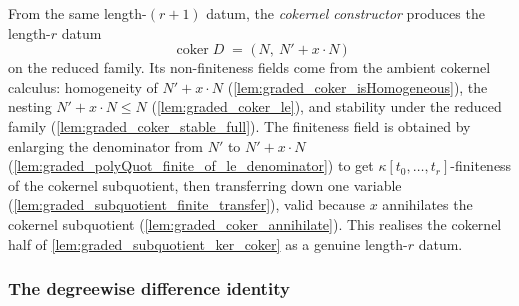 \begin{definition}\leanok
  \label{def:graded_subquotientDatum_coker}
  From the same length-\((r+1)\) datum, the \emph{cokernel constructor} produces the
  length-\(r\) datum
  \[
    \operatorname{coker} D \;=\; \bigl(\,N,\ N' + x \cdot N\,\bigr)
  \]
  on the reduced family. Its non-finiteness fields come from the ambient cokernel
  calculus: homogeneity of \(N' + x \cdot N\) (\cref{lem:graded_coker_isHomogeneous}),
  the nesting \(N' + x \cdot N \le N\) (\cref{lem:graded_coker_le}), and stability
  under the reduced family (\cref{lem:graded_coker_stable_full}). The finiteness field
  is obtained by enlarging the denominator from \(N'\) to \(N' + x \cdot N\)
  (\cref{lem:graded_polyQuot_finite_of_le_denominator}) to get
  \(\kappa[t_0, \dots, t_r]\)-finiteness of the cokernel subquotient, then
  transferring down one variable (\cref{lem:graded_subquotient_finite_transfer}),
  valid because \(x\) annihilates the cokernel subquotient
  (\cref{lem:graded_coker_annihilate}). This realises the cokernel half of
  \cref{lem:graded_subquotient_ker_coker} as a genuine length-\(r\) datum.
\end{definition}

\subsubsection*{The degreewise difference identity}

